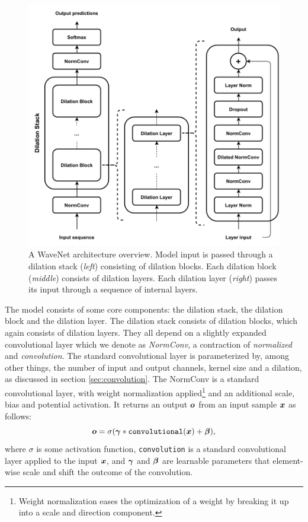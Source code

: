 \begin{figure}[H]
    \centering
    \includegraphics{report/figures/wavenet_architecture.pdf}
    \caption{A WaveNet architecture overview. Model input is passed through a dilation stack (\textit{left}) consisting of dilation blocks. Each dilation block (\textit{middle}) consists of dilation layers. Each dilation layer (\textit{right}) passes its input through a sequence of internal layers.}
    \label{fig:wavenet_architecture}
\end{figure}

The model consists of some core components: the dilation stack, the dilation block and the dilation layer. The dilation stack consists of dilation blocks, which again consists of dilation layers. They all depend on a slightly expanded convolutional layer which we denote as \textit{NormConv}, a contraction of \textit{normalized} and \textit{convolution}. The standard convolutional layer is parameterized by, among other things, the number of input and output channels, kernel size and a dilation, as discussed in section \ref{sec:convolution}. The NormConv is a standard convolutional layer, with weight normalization applied\footnote{Weight normalization eases the optimization of a weight by breaking it up into a scale and direction component.} \cite{salimans2016weight} and an additional scale, bias and potential activation. It returns an output $\bm{ o }$ from an input sample $\bm{ x }$ as follows:
\[ \bm{ o } = \sigma{\mathopen{} \left( \bm{ \gamma } * \texttt{convolutional}{\mathopen{} \left( \bm{ x } \right) \mathclose{}} + \bm{ \beta } \right) \mathclose{}}, \]
where $\sigma$ is some activation function, \texttt{convolution} is a standard convolutional layer applied to the input $\bm{ x }$, and $\bm{ \gamma }$ and $\bm{ \beta }$ are learnable parameters that element-wise scale and shift the outcome of the convolution.

